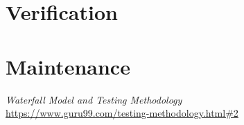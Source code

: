\documentclass[12pt]{article}
\begin{document}
\begin{myspace}{1.7}
\section*{Verification}






%
%
\pagebreak
\section*{Maintenance}  





%
%
\pagebreak
\begin{thebibliography}{9}
   \textit{Waterfall Model and Testing Methodology}\\
   \url{https://www.guru99.com/testing-methodology.html#2}

\end{thebibliography}
  
\end{myspace}
\end{document}
